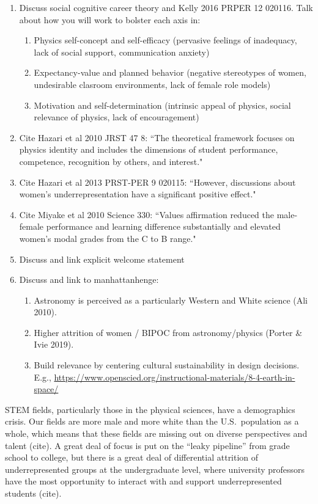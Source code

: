 \documentclass[11pt]{article}
\begin{document}
\thispagestyle{fancy}

\begin{enumerate}
    \item Discuss social cognitive career theory and Kelly 2016 PRPER 12 020116. Talk about how you will work to bolster each axis in:
        \begin{enumerate}
            \item Physics self-concept and self-efficacy (pervasive feelings of inadequacy, lack of social support, communication anxiety)
            \item Expectancy-value and planned behavior (negative stereotypes of women, undesirable clasroom environments, lack of female role models)
            \item Motivation and self-determination (intrinsic appeal of physics, social relevance of physics, lack of encouragement)
        \end{enumerate}
    \item Cite Hazari et al 2010 JRST 47 8: ``The theoretical framework focuses on physics identity and includes the dimensions of student performance, competence, recognition by others, and interest."
    \item Cite Hazari et al 2013 PRST-PER 9 020115: ``However, discussions about women’s underrepresentation have a significant positive effect."
    \item Cite Miyake et al 2010 Science 330: ``Values affirmation reduced the male-female performance and learning difference substantially and elevated women’s modal grades from the C to B range."
    \item Discuss and link explicit welcome statement
    \item Discuss and link to manhattanhenge:
        \begin{enumerate}
            \item Astronomy is perceived as a particularly Western and White science (Ali 2010).
            \item Higher attrition of women / BIPOC from astronomy/physics (Porter \& Ivie 2019).
            \item Build relevance by centering cultural sustainability in design decisions. E.g., \url{https://www.openscied.org/instructional-materials/8-4-earth-in-space/}
        \end{enumerate}
\end{enumerate}



STEM fields, particularly those in the physical sciences, have a demographics crisis. 
Our fields are more male and more white than the U.S.~population as a whole, which means that these fields are missing out on diverse perspectives and talent (cite). 
A great deal of focus is put on the “leaky pipeline” from grade school to college, but there is a great deal of differential attrition of underrepresented groups at the undergraduate level, where university professors have the most opportunity to interact with and support underrepresented students (cite). 
\end{document}
